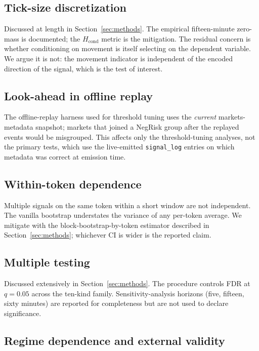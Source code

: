 \documentclass[review,12pt,authoryear]{elsarticle}
\begin{document}
\subsection{Tick-size discretization}

Discussed at length in Section~\ref{sec:methods}. The empirical
fifteen-minute zero-mass is documented; the \(H_\text{cond}\) metric is the
mitigation. The residual concern is whether conditioning on movement is
itself selecting on the dependent variable. We argue it is not: the
movement indicator is independent of the encoded direction of the signal,
which is the test of interest.

\subsection{Look-ahead in offline replay}

The offline-replay harness used for threshold tuning uses the \emph{current}
markets-metadata snapshot; markets that joined a NegRisk group after the
replayed events would be misgrouped. This affects only the threshold-tuning
analyses, not the primary tests, which use the live-emitted
\texttt{signal\_log} entries on which metadata was correct at emission time.

\subsection{Within-token dependence}

Multiple signals on the same token within a short window are not
independent. The vanilla bootstrap understates the variance of any per-token
average. We mitigate with the block-bootstrap-by-token estimator described
in Section~\ref{sec:methods}; whichever CI is wider is the reported claim.

\subsection{Multiple testing}

Discussed extensively in Section~\ref{sec:methods}. The
\citet{BenjaminiHochberg1995} procedure controls FDR at \(q = 0.05\) across
the ten-kind family. Sensitivity-analysis horizons (five, fifteen, sixty
minutes) are reported for completeness but are not used to declare
significance.

\subsection{Regime dependence and external validity}
\end{document}
